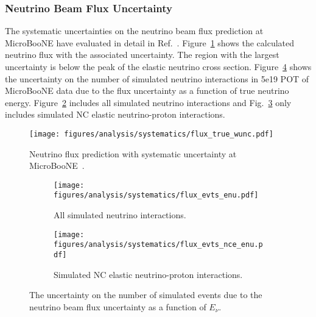   \subsubsection{Neutrino Beam Flux Uncertainty}\label{sec:fluxuncertainty}
    The systematic uncertainties on the neutrino beam flux prediction at
    MicroBooNE have evaluated in detail in Ref.~\cite{uBFluxNote}.
    Figure~\ref{fig:ubflux} shows the calculated neutrino flux with the
    associated uncertainty. The region with the largest uncertainty is below
    the peak of the elastic neutrino cross section. Figure~\ref{fig:fluxenu}
    shows the uncertainty on the number of simulated neutrino interactions in
    5e19 POT of MicroBooNE data due to the flux uncertainty as a function of
    true neutrino energy. Figure~\ref{fig:fluxenuall} includes all simulated
    neutrino interactions and Fig.~\ref{fig:fluxenunce} only includes simulated
    NC elastic neutrino-proton interactions.
    \begin{figure}[ht]
      \centering
      \texttt{[image: figures/analysis/systematics/flux\_true\_wunc.pdf]}
      \caption{Neutrino flux prediction with systematic uncertainty at
      MicroBooNE~\cite{uBFluxNote}.}
      \label{fig:ubflux}
    \end{figure}
    \begin{figure}[h]
      \centering
      \begin{subfigure}[t]{2.8in}
        \texttt{[image: figures/analysis/systematics/flux\_evts\_enu.pdf]}
        \caption{All simulated neutrino interactions.}
        \label{fig:fluxenuall}
      \end{subfigure}
      \hspace{2pt}
      \begin{subfigure}[t]{2.8in}
        \texttt{[image: figures/analysis/systematics/flux\_evts\_nce\_enu.pdf]}
        \caption{Simulated NC elastic neutrino-proton interactions.}
        \label{fig:fluxenunce}
      \end{subfigure}
      \caption{The uncertainty on the number of simulated events due to the
      neutrino beam flux uncertainty as a function of $E_{\nu}$.}
      \label{fig:fluxenu}
    \end{figure}

